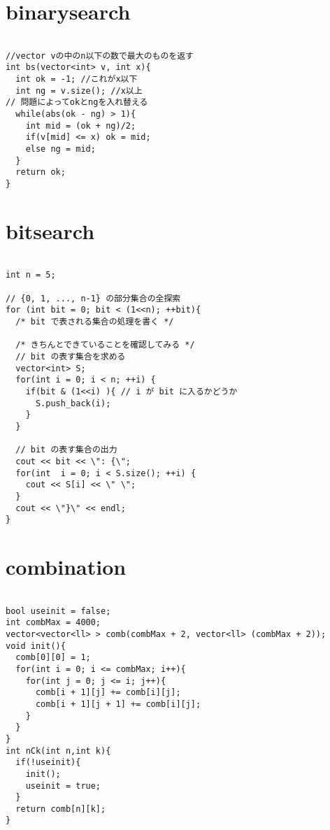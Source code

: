 \documentclass[a4j,titlepage]{jarticle} %
\begin{document}
\color{white}
\section{binarysearch}
\color{black}
\begin{lstlisting}[caption=binarysearch]

//vector vの中のn以下の数で最大のものを返す
int bs(vector<int> v, int x){
  int ok = -1; //これがx以下 
  int ng = v.size(); //x以上 
// 問題によってokとngを入れ替える
  while(abs(ok - ng) > 1){
    int mid = (ok + ng)/2;
    if(v[mid] <= x) ok = mid;
    else ng = mid;
  }
  return ok;
}

\end{lstlisting}

\color{white}
\section{bitsearch}
\color{black}
\begin{lstlisting}[caption=bitsearch]

int n = 5;

// {0, 1, ..., n-1} の部分集合の全探索
for (int bit = 0; bit < (1<<n); ++bit){
  /* bit で表される集合の処理を書く */
  
  /* きちんとできていることを確認してみる */
  // bit の表す集合を求める
  vector<int> S;
  for(int i = 0; i < n; ++i) {
    if(bit & (1<<i) ){ // i が bit に入るかどうか
      S.push_back(i);
    }
  }
  
  // bit の表す集合の出力
  cout << bit << \": {\";
  for(int  i = 0; i < S.size(); ++i) {
    cout << S[i] << \" \";
  }
  cout << \"}\" << endl;
}

\end{lstlisting}

\color{white}
\section{combination}
\color{black}
\begin{lstlisting}[caption=combination]

bool useinit = false;
int combMax = 4000;
vector<vector<ll> > comb(combMax + 2, vector<ll> (combMax + 2));
void init(){
  comb[0][0] = 1;
  for(int i = 0; i <= combMax; i++){
    for(int j = 0; j <= i; j++){
      comb[i + 1][j] += comb[i][j];
      comb[i + 1][j + 1] += comb[i][j];
    }
  }
}
int nCk(int n,int k){
  if(!useinit){
    init();
    useinit = true;
  }
  return comb[n][k];
}

\end{lstlisting}
\end{document}
